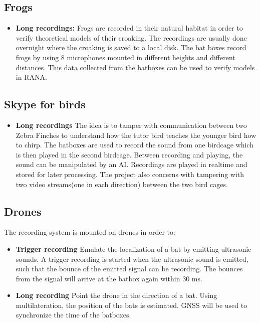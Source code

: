 \subsection{Frogs}
\begin{itemize}
	\item \textbf{Long recordings:} Frogs are recorded in their natural habitat in order to verify theoretical models of their croaking. The recordings are usually done overnight where the croaking is saved to a local disk. The bat boxes record frogs by using 8 microphones mounted in different heights and different distances. This data collected from the batboxes can be used to verify models in RANA.
\end{itemize}


\subsection{Skype for birds}
\begin{itemize}
	\item \textbf{Long recordings} The idea is to tamper with communication between two Zebra Finches to understand how the tutor bird teaches the younger bird how to chirp. The batboxes are used to record the sound from one birdcage which is then played in the second birdcage. Between recording and playing, the sound can be manipulated by an AI. Recordings are played in realtime and stored for later processing. The project also concerns with tampering with two video streams(one in each direction) between the two bird cages. 
\end{itemize}


\subsection{Drones}
The recording system is mounted on drones in order to:
\begin{itemize}
	\item \textbf{Trigger recording} Emulate the localization of a bat by emitting ultrasonic sounds. A trigger recording is started when the ultrasonic sound is emitted, such that the bounce of the emitted signal can be recording. The bounces from the signal will arrive at the batbox again within 30 ms.
	
	\item \textbf{Long recording} Point  the drone in the direction of a bat. Using multilateration, the position of the bats is estimated. GNSS will be used to synchronize the time of the batboxes. 
\end{itemize}

